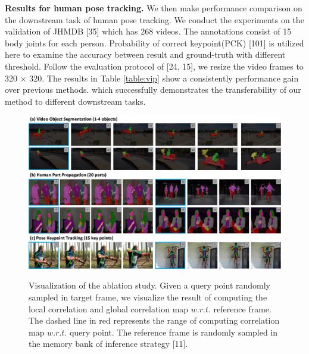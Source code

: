 \documentclass{article}
\begin{document}
\textbf{Results for human pose tracking.} We then make performance comparison on the downstream task of human pose tracking. We conduct the experiments on the validation of JHMDB [35] which has 268 videos.  The annotations consist of 15 body joints for each person. Probability of correct keypoint(PCK) [101] is utilized here to examine the accuracy between result and  ground-truth with different threshold. Follow the evaluation protocol of [24, 15], we resize the video frames to 320 $\times$ 320. The results in Table \ref{table:vip} show a consistently performance gain over previous methods. which successfully demonstrates the transferability of our method to different downstream tasks.


\begin{figure}[!tb]
  \centering
  {\includegraphics[width=1.0\textwidth]{figure/quantitative_results/quan.pdf}}
  \caption{\small Visualization of the ablation study. Given a query point randomly sampled in target frame, we visualize the result of computing the local correlation and global correlation map $w.r.t.$ reference frame. The dashed line in red represents the range of computing correlation map $w.r.t.$ query point. The reference frame is randomly sampled in the memory bank of inference strategy [11]. }
  \label{fig:quan}
  \vspace{-3mm}
\end{figure}
\end{document}
